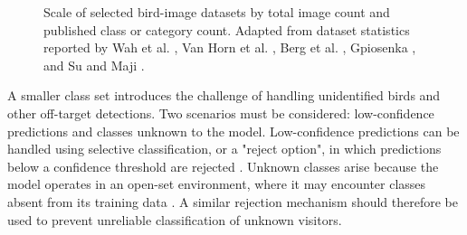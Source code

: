 \begin{figure}[htbp]

    \caption[
        Comparison of the scale of selected bird-image datasets
    ]{
        Scale of selected bird-image datasets by total image count
        and published class or category count. Adapted from dataset
        statistics reported by Wah et al. \cite{WahEtAl2011},
        Van Horn et al. \cite{VanHornEtAl2015},
        Berg et al. \cite{BergEtAl2014},
        Gpiosenka \cite{Birds525Dataset}, and
        Su and Maji \cite{SuMaji2021}.
    }
    \label{fig:bird-dataset-scale}

    \vspace{0.4em}
\end{figure}

A smaller class set introduces the challenge of handling unidentified birds and other off-target detections. Two scenarios must be considered: low-confidence predictions and classes unknown to the model. Low-confidence predictions can be handled using selective classification, or a "reject option", in which predictions below a confidence threshold are rejected \cite{GeifmanElYaniv2017}. Unknown classes arise because the model operates in an open-set environment, where it may encounter classes absent from its training data \cite{ScheirerEtAl2013}. A similar rejection mechanism should therefore be used to prevent unreliable classification of unknown visitors.


